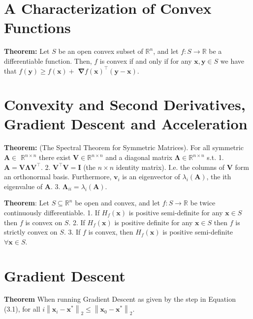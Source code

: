 \section{A Characterization of Convex Functions}
\textbf{Theorem:}
Let $S$ be an open convex subset of $\mathbb{R}^{n}$, and let $f: S \rightarrow \mathbb{R}$ be a differentiable function. Then, $f$ is convex if and only if for any $\boldsymbol{x}, \boldsymbol{y} \in S$ we have that $f(\boldsymbol{y}) \geq f(\boldsymbol{x})+$ $\boldsymbol{\nabla} f(\boldsymbol{x})^{\top}(\boldsymbol{y}-\boldsymbol{x}) .$
\section{Convexity and Second Derivatives,
Gradient Descent and Acceleration}
\textbf{Theorem:} (The Spectral Theorem for Symmetric Matrices). For all symmetric $\boldsymbol{A} \in$ $\mathbb{R}^{n \times n}$ there exist $\boldsymbol{V} \in \mathbb{R}^{n \times n}$ and a diagonal matrix $\boldsymbol{\Lambda} \in \mathbb{R}^{n \times n}$ s.t.
1. $\boldsymbol{A}=\boldsymbol{V} \boldsymbol{\Lambda} \boldsymbol{V}^{\top}$.
2. $\boldsymbol{V}^{\top} \boldsymbol{V}=\boldsymbol{I}$ (the $n \times n$ identity matrix). I.e. the columns of $\boldsymbol{V}$ form an orthonormal basis. Furthermore, $\boldsymbol{v}_{i}$ is an eigenvector of $\lambda_{i}(\boldsymbol{A})$, the ith eigenvalue of $\boldsymbol{A}$.
3. $\boldsymbol{\Lambda}_{i i}=\lambda_{i}(\boldsymbol{A})$.

\textbf{Theorem}:
Let $S \subseteq \mathbb{R}^{n}$ be open and convex, and let $f: S \rightarrow \mathbb{R}$ be twice continuously differentiable.
1. If $H_{f}(\boldsymbol{x})$ is positive semi-definite for any $\boldsymbol{x} \in S$ then $f$ is convex on $S$.
2. If $H_{f}(\boldsymbol{x})$ is positive definite for any $\boldsymbol{x} \in S$ then $f$ is strictly convex on $S$.
3. If $f$ is convex, then $H_{f}(\boldsymbol{x})$ is positive semi-definite $\forall \boldsymbol{x} \in S$.

\section{Gradient Descent}
\textbf{Theorem} When running Gradient Descent as given by the step in Equation (3.1), for all $i\left\|\boldsymbol{x}_{i}-\boldsymbol{x}^{*}\right\|_{2} \leq\left\|\boldsymbol{x}_{0}-\boldsymbol{x}^{*}\right\|_{2}$.


